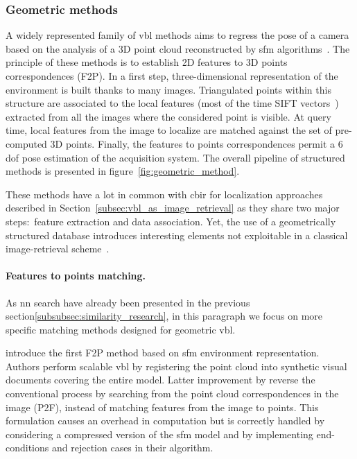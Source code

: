 \subsubsection{Geometric methods}


\label{subsubsec:sfm_methods}
A widely represented family of \ac{vbl} methods aims to regress the pose of a camera based on the analysis of a 3D point cloud reconstructed by \ac{sfm} algorithms~\citep{schoenberger2016sfm,moulon2016openmvg,rupnik2017micmac}. The principle of these methods is to establish 2D features to 3D points correspondences (F2P). In a first step, three-dimensional representation of the environment is built thanks to many images. Triangulated points within this structure are associated to the local features (most of the time SIFT vectors~\citep{Lowe2004}) extracted from all the images where the considered point is visible. At query time, local features from the image to localize are matched against the set of pre-computed 3D points. Finally, the features to points correspondences permit a 6 \ac{dof} pose estimation of the acquisition system. The overall pipeline of structured methods is presented in figure~\ref{fig:geometric_method}.

These methods have a lot in common with \ac{cbir} for localization approaches described in Section~\ref{subsec:vbl_as_image_retrieval} as they share two major steps:~feature extraction and data association. Yet, the use of a geometrically structured database introduces interesting elements not exploitable in a classical image-retrieval scheme~\citep{Sattler2012a}.

\paragraph{Features to points matching.}
As \ac{nn} search have already been presented in the previous section\ref{subsubsec:similarity_research}, in this paragraph we focus on more specific matching methods designed for geometric \ac{vbl}.

\citet{Irschara2009} introduce the first F2P method based on \ac{sfm} environment representation. Authors perform scalable \ac{vbl} by registering the point cloud into synthetic visual documents covering the entire model. Latter improvement by \citet{Li2010} reverse the conventional process by searching from the point cloud correspondences in the image (P2F), instead of matching features from the image to points. This formulation causes an overhead in computation but is correctly handled by considering a compressed version of the \ac{sfm} model and by implementing end-conditions and rejection cases in their algorithm.

